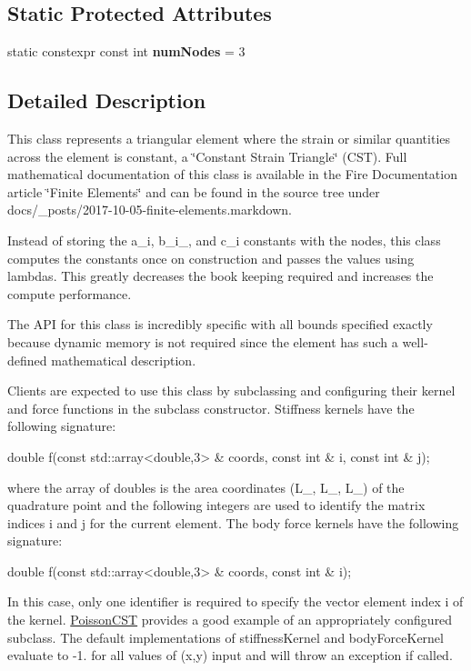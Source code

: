 \subsection*{Static Protected Attributes}
\begin{DoxyCompactItemize}
\item 
\mbox{\label{a00770_a3e23c9ef56fcb6641d5aa727370a827e}} 
static constexpr const int {\bfseries num\+Nodes} = 3
\end{DoxyCompactItemize}


\subsection{Detailed Description}
This class represents a triangular element where the strain or similar quantities across the element is constant, a \char`\"{}\+Constant Strain Triangle\char`\"{} (C\+ST). Full mathematical documentation of this class is available in the Fire Documentation article \char`\"{}\+Finite Elements\char`\"{} and can be found in the source tree under docs/\+\_\+posts/2017-\/10-\/05-\/finite-\/elements.\+markdown.

Instead of storing the a\+\_\+i, b\+\_\+i\+\_\+, and c\+\_\+i constants with the nodes, this class computes the constants once on construction and passes the values using lambdas. This greatly decreases the book keeping required and increases the compute performance.

The A\+PI for this class is incredibly specific with all bounds specified exactly because dynamic memory is not required since the element has such a well-\/defined mathematical description.

Clients are expected to use this class by subclassing and configuring their kernel and force functions in the subclass\textquotesingle{} constructor. Stiffness kernels have the following signature\+: 
\begin{DoxyCode}
\textcolor{keywordtype}{double} f(\textcolor{keyword}{const} std::array<double,3> & coords, \textcolor{keyword}{const} \textcolor{keywordtype}{int} & i,
\textcolor{keyword}{const} \textcolor{keywordtype}{int} & j);
\end{DoxyCode}
 where the array of doubles is the area coordinates (L\+\_, L\+\_, L\+\_) of the quadrature point and the following integers are used to identify the matrix indices i and j for the current element. The body force kernels have the following signature\+: 
\begin{DoxyCode}
\textcolor{keywordtype}{double} f(\textcolor{keyword}{const} std::array<double,3> & coords, \textcolor{keyword}{const} \textcolor{keywordtype}{int} & i);
\end{DoxyCode}
 In this case, only one identifier is required to specify the vector element index i of the kernel. \hyperlink{a00790}{Poisson\+C\+ST} provides a good example of an appropriately configured subclass. The default implementations of stiffness\+Kernel and body\+Force\+Kernel evaluate to -\/1. for all values of (x,y) input and will throw an exception if called.

